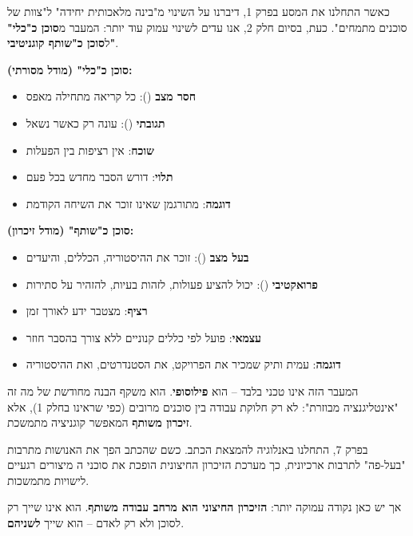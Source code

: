 

כאשר התחלנו את המסע בפרק \num{1}, דיברנו על השינוי מ"בינה מלאכותית יחידה" ל"צוות של סוכנים מתמחים". כעת, בסיום חלק \num{2}, אנו עדים לשינוי עמוק עוד יותר: המעבר מ\textbf{סוכן כ"כלי"} ל\textbf{סוכן כ"שותף קוגניטיבי"}.

\textbf{סוכן כ"כלי" (מודל מסורתי):}
\begin{itemize}
  \item \textbf{חסר מצב} (): כל קריאה מתחילה מאפס
  \item \textbf{תגובתי} (): עונה רק כאשר נשאל
  \item \textbf{שוכח}: אין רציפות בין הפעלות
  \item \textbf{תלוי}: דורש הסבר מחדש בכל פעם
  \item \textbf{דוגמה}: מתורגמן שאינו זוכר את השיחה הקודמת
\end{itemize}

\textbf{סוכן כ"שותף" (מודל זיכרון):}
\begin{itemize}
  \item \textbf{בעל מצב} (): זוכר את ההיסטוריה, הכללים, והיעדים
  \item \textbf{פרואקטיבי} (): יכול להציע פעולות, לזהות בעיות, להזהיר על סתירות
  \item \textbf{רציף}: מצטבר ידע לאורך זמן
  \item \textbf{עצמאי}: פועל לפי כללים קנוניים ללא צורך בהסבר חוזר
  \item \textbf{דוגמה}: עמית ותיק שמכיר את הפרויקט, את הסטנדרטים, ואת ההיסטוריה
\end{itemize}

המעבר הזה אינו טכני בלבד – הוא \textbf{פילוסופי}. הוא משקף הבנה מחודשת של מה זה "אינטליגנציה מבוזרת": לא רק חלוקת עבודה בין סוכנים מרובים (כפי שראינו בחלק \num{1}), אלא \textbf{זיכרון משותף} המאפשר קוגניציה מתמשכת.


בפרק \num{7}, התחלנו באנלוגיה להמצאת הכתב. כשם שהכתב הפך את האנושות מתרבות "בעל-פה" לתרבות ארכיונית, כך מערכת הזיכרון החיצונית הופכת את סוכני ה מיצורים רגעיים לישויות מתמשכות.

אך יש כאן נקודה עמוקה יותר: \textbf{הזיכרון החיצוני הוא מרחב עבודה משותף}. הוא אינו שייך רק לסוכן ולא רק לאדם – הוא שייך \textbf{לשניהם}.

